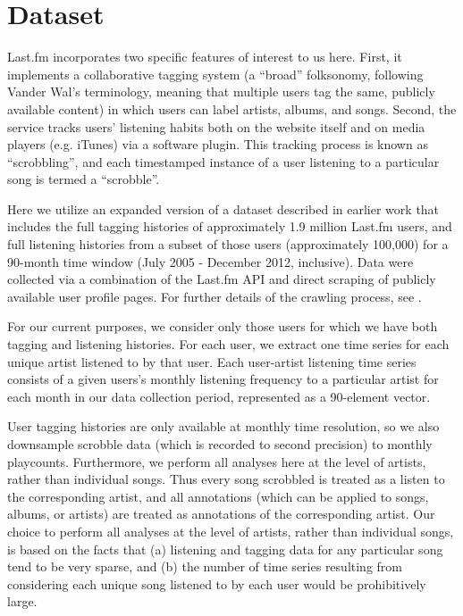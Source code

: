 \section{Dataset}
\label{sec_dataset}
Last.fm incorporates two specific features of interest to us here. First, it implements a collaborative tagging system (a ``broad'' folksonomy, following Vander Wal's \cite{VanderWal2005} terminology, meaning that multiple users tag the same, publicly available content) in which users can label artists, albums, and songs. Second, the service tracks users' listening habits both on the website itself and on media players (e.g. iTunes) via a software plugin. This tracking process is known as ``scrobbling'', and each timestamped instance of a user listening to a particular song is termed a ``scrobble''.

Here we utilize an expanded version of a dataset described in earlier work \cite{Lorince2013,Lorince2014} that includes the full tagging histories of approximately 1.9 million Last.fm users, and full listening histories from a subset of those users (approximately 100,000) for a 90-month time window (July 2005 - December 2012, inclusive). Data were collected via a combination of the Last.fm API and direct scraping of publicly available user profile pages. For further details of the crawling process, see \cite{Lorince2013,Lorince2014}.

For our current purposes, we consider only those users for which we have both tagging and listening histories. For each user, we extract one time series for each unique artist listened to by that user. Each user-artist listening time series consists of a given users's monthly listening frequency to a particular artist for each month in our data collection period, represented as a 90-element vector.

User tagging histories are only available at monthly time resolution, so we also downsample scrobble data (which is recorded to second precision) to monthly playcounts. Furthermore, we perform all analyses here at the level of artists, rather than individual songs. Thus every song scrobbled is treated as a listen to the corresponding artist, and all annotations (which can be applied to songs, albums, or artists) are treated as annotations of the corresponding artist. Our choice to perform all analyses at the level of artists, rather than individual songs, is based on the facts that (a) listening and tagging data for any particular song tend to be very sparse, and (b) the number of time series resulting from considering each unique song listened to by each user would be prohibitively large.


